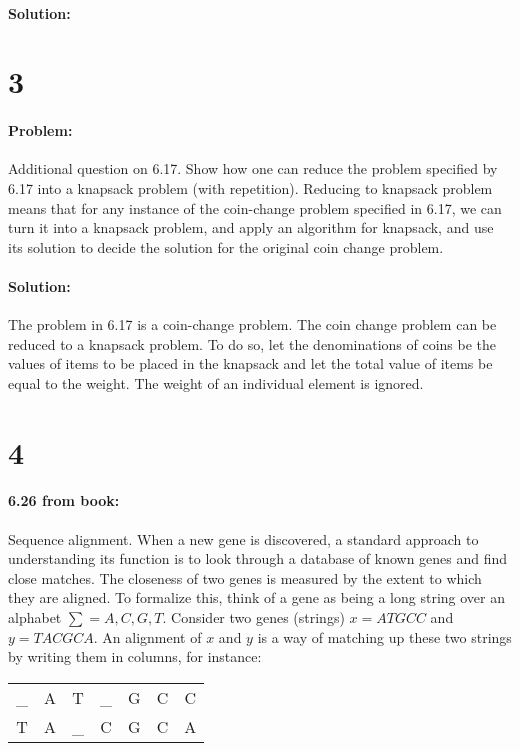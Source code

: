 \documentclass[12pt]{article}
\begin{document}
\paragraph{Solution:}


\section*{3}
\paragraph{Problem:}
Additional question on 6.17. Show how one can reduce the problem specified by
6.17 into a knapsack problem (with repetition). Reducing to knapsack problem
means that for any instance of the coin-change problem specified in 6.17, we
can turn it into a knapsack problem, and apply an algorithm for knapsack, and
use its solution to decide the solution for the original coin change problem.
\paragraph{Solution:}

The problem in 6.17 is a coin-change problem. The coin change problem
can be reduced to a knapsack problem. To do so, let the denominations of
coins be the values of items to be placed in the knapsack and let the
total value of items be equal to the weight. The weight of an individual
element is ignored.

\section*{4}
\paragraph{6.26 from book:}
Sequence alignment. When a new gene is discovered, a standard approach to
understanding its function is to look through a database of known genes and
find close matches. The closeness of two genes is measured by the extent to 
which they are aligned. To formalize this, think of a gene as being a long
string over an alphabet $\sum = {A, C, G, T}$. Consider two genes (strings)
$x = AT GCC$ and $y = T ACGCA$. An alignment of $x$ and $y$ is a way of matching up
these two strings by writing them in columns, for instance:

\begin{center}
\begin{tabular}{c c c c c c c}
\_ &A &T &\_ &G &C &C \\
T &A &\_ &C &G &C &A
\end{tabular}
\end{center}
\end{document}
